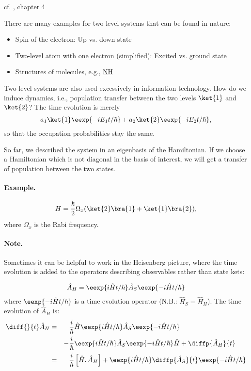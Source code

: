 cf. \cite{cohen}, chapter 4

		There are many examples for two-level systems that can be found in nature:
		\begin{itemize}
			\item Spin of the electron: Up vs. down state
			\item Two-level atom with one electron (simplified): Excited vs. ground state
			\item Structures of molecules, e.g., \hyperref[fig:twostate]{NH}
		\end{itemize}
		Two-level systems are also used excessively in information technology.
		How do we induce dynamics, i.e., population transfer between the two levels $\ket{1}$ and $\ket{2}$? The time evolution is merely
		\begin{align}
			a_1\ket{1}\eexp{-i{E_1 t}/{\hbar}} + a_2\ket{2}\eexp{-i{E_2 t}/{\hbar}},
		\end{align}
		so that the occupation probabilities stay the same. 
		
		So far, we described the system in an eigenbasis of the Hamiltonian.
		If we choose a Hamiltonian which is not diagonal in the basis of interest, we will get a transfer of population between the two states.

				\paragraph{Example.}
					\begin{align}
						H=\frac{\hbar}{2}\Omega_x(\ket{2}\bra{1} + \ket{1}\bra{2}),
					\end{align}
					where $\Omega_x$ is the Rabi frequency.

				\paragraph{Note.} Sometimes it can be helpful to work in the Heisenberg picture, where the time evolution is added to the operators describing observables rather than state kets:

					\begin{align}
						\hat{A}_H=\eexp{i{\hat{H} t}/{\hbar}} \hat{A}_S \eexp{-i{\hat{H} t}/{\hbar}}
					\end{align}
					where $\eexp{-i{\hat{H} t}/{\hbar}}$ is a time evolution operator (N.B.: $\hat{H}_S = \hat{H}_H$). The time evolution of $\hat{A}_H$ is:
					\begin{align}
						\notag \diff{}{t} \hat{A}_H &=&& \frac{i}{\hbar}\hat{H}\eexp{i{\hat{H}t}/{\hbar}}\hat{A}_S \eexp{-i{\hat{H} t}/{\hbar}}\\ 
						&&-&\frac{i}{\hbar} \eexp{i{\hat{H} t}/{\hbar}}\hat{A}_S \eexp{-i{\hat{H}t}/{\hbar}}\hat{H}+\diffp{\hat{A}_H}{t}\\
						&=&& \frac{i}{\hbar}\left[\hat{H},\hat{A}_H\right] + \eexp{i{\hat{H}t}/{\hbar}}\diffp{\hat{A}_S}{t}\eexp{-i{\hat{H}t}/{\hbar}}
					\end{align}

